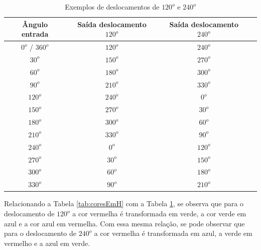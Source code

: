 \documentclass[	12pt, Times, openright, twoside, a4paper, english, brazil]{abntex2}
\begin{document}
\begin{table}[ht]
\centering
\begin{tabular}{cccc}
\hline      

\textbf{Ângulo entrada} & \textbf{Saída deslocamento $120^o$} & \textbf{Saída deslocamento $240^o$}     \\ \hline
$0^o$ / $360^o$         & $120^o$                       &  $240^o$                          \\ \hline
$30^o$                  & $150^o$                       &  $270^o$                          \\ \hline
$60^o$                  & $180^o$                       &  $300^o$                          \\ \hline
$90^o$                  & $210^o$                       &  $330^o$                          \\ \hline
$120^o$                 & $240^o$                       &  $0^o$                            \\ \hline
$150^o$                 & $270^o$                       &  $30^o$                           \\ \hline
$180^o$                 & $300^o$                       &  $60^o$                           \\ \hline
$210^o$                 & $330^o$                       &  $90^o$                           \\ \hline
$240^o$                 & $0^o$                         &  $120^o$                          \\ \hline
$270^o$                 & $30^o$                        &  $150^o$                          \\ \hline
$300^o$                 & $60^o$                        &  $180^o$                          \\ \hline
$330^o$                 & $90^o$                        &  $210^o$                          \\ \hline

\end{tabular}
\caption{Exemplos de deslocamentos de $120^o$ e $240^o$}
\label{tab:exemplosDeslocamento}
\end{table}

Relacionando a Tabela \ref{tab:coresEmH} com a Tabela \ref{tab:exemplosDeslocamento}, se observa que para o deslocamento de $120^o$ a cor vermelha é transformada em verde, a cor verde em azul e a cor azul em vermelha. Com essa mesma relação, se pode observar que para o deslocamento de $240^o$ a cor vermelha é transformada em azul, a verde em vermelho e a azul em verde.
\end{document}
